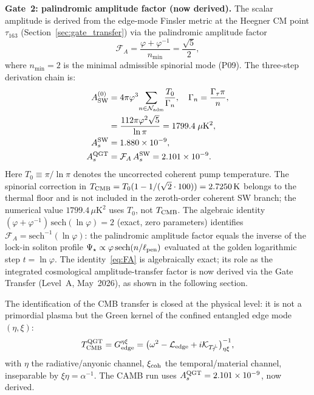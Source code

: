 \documentclass[twocolumn,10pt]{article}
\newcommand{\vp}{\varphi}
\newcommand{\Gt}{\Gamma_\tau}
\newcommand{\Nadm}{\mathcal{N}_{\rm adm}}
\begin{document}
\medskip
\noindent\textbf{Gate~2: palindromic amplitude factor (now derived).}
The scalar amplitude is derived from the edge-mode Finsler metric
at the Heegner CM point $\tau_{163}$ (Section~\ref{sec:gate_transfer})
via the palindromic amplitude factor
\begin{equation}
  \mathcal{F}_A = \frac{\vp+\vp^{-1}}{n_{\min}} = \frac{\sqrt{5}}{2},
  \label{eq:FA}
\end{equation}
where $n_{\min}=2$ is the minimal admissible spinorial mode (P09).
The three-step derivation chain is:
\begin{align}
  A_{\rm SW}^{(0)}
  &= 4\pi\vp^3\!\sum_{n\in\Nadm}\!\frac{T_0}{\Gamma_n},
   \quad \Gamma_n=\frac{\Gt\pi}{n},
   \nonumber\\
  &= \frac{112\pi\vp^2\sqrt{5}}{\ln\pi}
   = 1799.4\;\mu{\rm K}^2, \label{eq:ASW_gate2}\\
  A_s^{\rm SW} &= 1.880\times10^{-9},\\
  A_s^{\rm QGT} &= \mathcal{F}_A\,A_s^{\rm SW}
                          = 2.101\times10^{-9}.
  \label{eq:As_gate2}
\end{align}
Here $T_0\equiv\pi/\ln\pi$ denotes the uncorrected coherent pump
temperature. The spinorial correction in
$T_{\rm CMB}=T_0(1-1/(\sqrt{2}\cdot100))=2.7250\,\mathrm{K}$
belongs to the thermal floor and is not included in the zeroth-order
coherent SW branch; the numerical value $1799.4\,\mu\mathrm{K}^2$
uses $T_0$, not $T_{\rm CMB}$.
The algebraic identity $(\vp+\vp^{-1})\,\mathrm{sech}(\ln\vp)=2$
(exact, zero parameters) identifies $\mathcal{F}_A = \mathrm{sech}^{-1}(\ln\vp)$:
the palindromic amplitude factor equals the inverse of the lock-in
soliton profile $\Psi_\star\propto\vp\,\mathrm{sech}(n/\ell_{\rm pen})$
evaluated at the golden logarithmic step $t=\ln\vp$.
The identity~\eqref{eq:FA} is algebraically exact;
its role as the integrated cosmological amplitude-transfer factor
is now derived via the Gate Transfer (Level~A, May~2026),
as shown in the following section.

The identification of the CMB transfer is closed at the physical
level: it is not a primordial plasma but the Green kernel of the
confined entangled edge mode $(\eta,\xi)$:
\begin{equation*}
  T_{\rm CMB}^{\rm QGT} = G_{\rm edge}^{\eta\xi}
  = \bigl(\omega^2 - \mathcal{L}_{\rm edge}
    + i\mathcal{K}_{T_7^\perp}\bigr)^{-1}_{\eta\xi},
\end{equation*}
with $\eta$ the radiative/anyonic channel, $\xi_{\rm coh}$ the
temporal/material channel, inseparable by $\xi\eta=\alpha^{-1}$.
The CAMB run uses $A_s^{\rm QGT}=2.101\times10^{-9}$, now derived.
\end{document}
